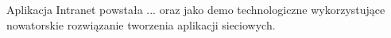 Aplikacja Intranet powstała ... oraz jako demo technologiczne wykorzystujące nowatorskie rozwiązanie tworzenia aplikacji sieciowych. 
